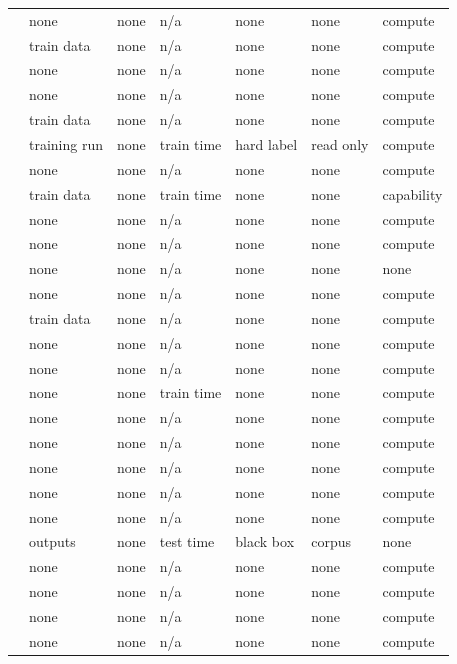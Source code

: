 \begin{landscape}
\begin{longtable}{rllllll}
\cite{BCEQ24} & none & none & n/a & none & none & compute \\
\cite{CIM19} & train data & none & n/a & none & none & compute \\
\cite{HMSTY25} & none & none & n/a & none & none & compute \\
\cite{MR25} & none & none & n/a & none & none & compute \\
\cite{MPRV09} & train data & none & n/a & none & none & compute \\
\cite{CK21} & training run & none & train time & hard label & read only & compute \\
\cite{ABIKN23} & none & none & n/a & none & none & compute \\
\cite{ACGMMTZ16} & train data & none & train time & none & none & capability \\
\cite{BJ23} & none & none & n/a & none & none & compute \\
\cite{DHSS25} & none & none & n/a & none & none & compute \\
\cite{AQPWPWCR22} & none & none & n/a & none & none & none \\
\cite{DSWZ23} & none & none & n/a & none & none & compute \\
\cite{RV24} & train data & none & n/a & none & none & compute \\
\cite{FGRVX17} & none & none & n/a & none & none & compute \\
\cite{DVV16} & none & none & n/a & none & none & compute \\
\cite{BIS17} & none & none & train time & none & none & compute \\
\cite{AS24} & none & none & n/a & none & none & compute \\
\cite{ACMS23} & none & none & n/a & none & none & compute \\
\cite{BCS24} & none & none & n/a & none & none & compute \\
\cite{BC22} & none & none & n/a & none & none & compute \\
\cite{AHY25} & none & none & n/a & none & none & compute \\
\cite{SHMWGWS26} & outputs & none & test time & black box & corpus & none \\
\cite{GJW22a} & none & none & n/a & none & none & compute \\
\cite{GJW22b} & none & none & n/a & none & none & compute \\
\cite{DPLB24} & none & none & n/a & none & none & compute \\
\cite{DLB25} & none & none & n/a & none & none & compute \\

\end{longtable}
\end{landscape}
